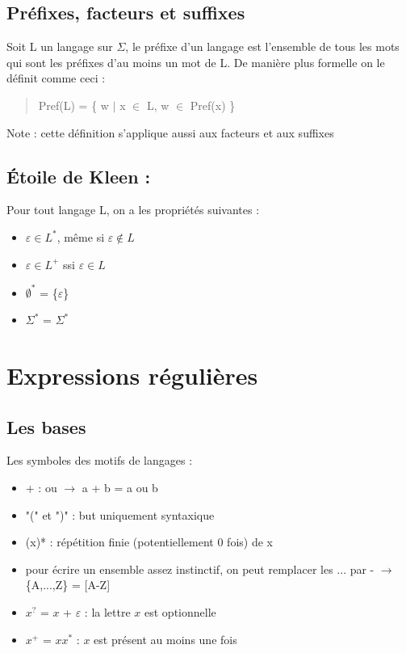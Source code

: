 \documentclass{article}
\begin{document}
\subsection{Préfixes, facteurs et suffixes}
Soit L un langage sur $\Sigma$, le préfixe d'un langage est l'ensemble de tous les mots qui sont les préfixes d'au moins un mot de L. De manière plus formelle on le définit comme ceci :
\begin{quote}
    Pref(L) = \{ w $|$ x $\in$ L, w $\in$ Pref(x) \} 
\end{quote}
Note : cette définition s'applique aussi aux facteurs et aux suffixes
\subsection{Étoile de Kleen :}
Pour tout langage L, on a les propriétés suivantes :
\begin{itemize}
    \item $\varepsilon \in L^{*}$, même si $\varepsilon \notin L$
    \item $\varepsilon \in L^{+}$ ssi $\varepsilon \in L$
    \item $\emptyset^{*}$ = \{$\varepsilon$\}
    \item $\Sigma^{*}$ = $\Sigma^{*}$
\end{itemize}
\newpage
\section{Expressions régulières}
\subsection{Les bases}
Les symboles des motifs de langages :
\begin{itemize}
    \item + : ou $\rightarrow$ a + b = a ou b
    \item "(" et ")" : but uniquement syntaxique
    \item (x)* : répétition finie (potentiellement 0 fois) de x
    \item pour écrire un ensemble assez instinctif, on peut remplacer les ... par - \newline $\rightarrow$ \{A,...,Z\} = [A-Z]
    \item $x^{?}$ = $x$ + $\varepsilon$ : la lettre $x$ est optionnelle
    \item $x^{+}$ = $xx^{*}$ : $x$ est présent au moins une fois
\end{itemize}
\end{document}
